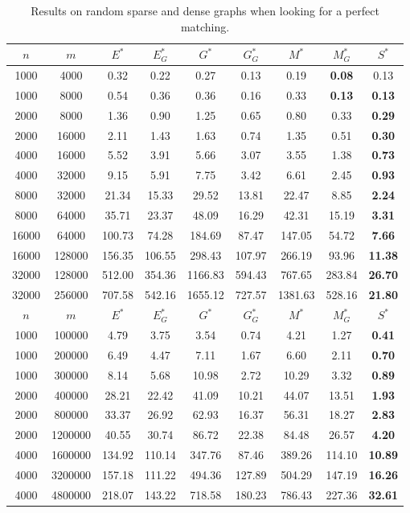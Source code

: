 \begin{table}
\centering
{} {
\begin{tabular}{
cc|ccccccc}
$n$ & $m$ & $E^*$ & $E^*_G$ & $G^*$ & $G^*_G$ & $M^*$ & $M^*_G$ & $S^*$ \\
\hline
1000 & 4000 & 0.32 & 0.22 & 0.27 & 0.13 & 0.19 & \textbf{0.08} & 0.13 \\
1000 & 8000 & 0.54 & 0.36 & 0.36 & 0.16 & 0.33 & \textbf{0.13} & \textbf{0.13} \\
2000 & 8000 & 1.36 & 0.90 & 1.25 & 0.65 & 0.80 & 0.33 & \textbf{0.29} \\
2000 & 16000 & 2.11 & 1.43 & 1.63 & 0.74 & 1.35 & 0.51 & \textbf{0.30} \\
4000 & 16000 & 5.52 & 3.91 & 5.66 & 3.07 & 3.55 & 1.38 & \textbf{0.73} \\
4000 & 32000 & 9.15 & 5.91 & 7.75 & 3.42 & 6.61 & 2.45 & \textbf{0.93} \\
8000 & 32000 & 21.34 & 15.33 & 29.52 & 13.81 & 22.47 & 8.85 & \textbf{2.24} \\
8000 & 64000 & 35.71 & 23.37 & 48.09 & 16.29 & 42.31 & 15.19 & \textbf{3.31} \\
16000 & 64000 & 100.73 & 74.28 & 184.69 & 87.47 & 147.05 & 54.72 & \textbf{7.66} \\
16000 & 128000 & 156.35 & 106.55 & 298.43 & 107.97 & 266.19 & 93.96 & \textbf{11.38} \\
32000 & 128000 & 512.00 & 354.36 & 1166.83 & 594.43 & 767.65 & 283.84 & \textbf{26.70} \\
32000 & 256000 & 707.58 & 542.16 & 1655.12 & 727.57 & 1381.63 & 528.16 & \textbf{21.80} \\
\midrule
$n$ & $m$ & $E^*$ & $E^*_G$ & $G^*$ & $G^*_G$ & $M^*$ & $M^*_G$ & $S^*$ \\
\hline
1000 & 100000 & 4.79 & 3.75 & 3.54 & 0.74 & 4.21 & 1.27 & \textbf{0.41} \\
1000 & 200000 & 6.49 & 4.47 & 7.11 & 1.67 & 6.60 & 2.11 & \textbf{0.70} \\
1000 & 300000 & 8.14 & 5.68 & 10.98 & 2.72 & 10.29 & 3.32 & \textbf{0.89} \\
2000 & 400000 & 28.21 & 22.42 & 41.09 & 10.21 & 44.07 & 13.51 & \textbf{1.93} \\
2000 & 800000 & 33.37 & 26.92 & 62.93 & 16.37 & 56.31 & 18.27 & \textbf{2.83} \\
2000 & 1200000 & 40.55 & 30.74 & 86.72 & 22.38 & 84.48 & 26.57 & \textbf{4.20} \\
4000 & 1600000 & 134.92 & 110.14 & 347.76 & 87.46 & 389.26 & 114.10 & \textbf{10.89} \\
4000 & 3200000 & 157.18 & 111.22 & 494.36 & 127.89 & 504.29 & 147.19 & \textbf{16.26} \\
4000 & 4800000 & 218.07 & 143.22 & 718.58 & 180.23 & 786.43 & 227.36 & \textbf{32.61} \\
\end{tabular}
}
\caption{Results on random sparse and dense graphs when looking for a perfect matching.}\label{tab:perfect}
\end{table}

